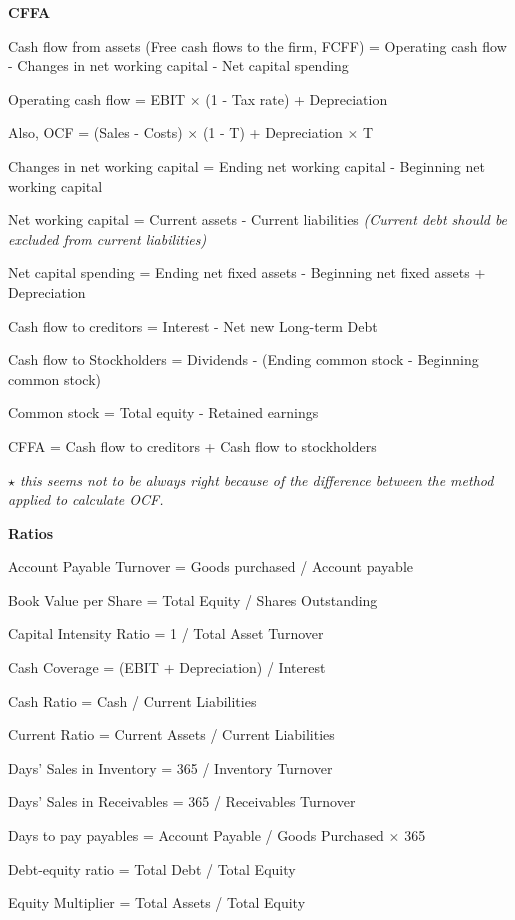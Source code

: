 \documentclass{article}
\newcommand{\properframed}[1]{
	{
		\centering
		\vspace{-2 ex}
		\begin{framed}
			\vspace{-1.5 ex}
			#1
			\vspace{-1.5 ex}
		\end{framed}
		\vspace{-2 ex}
	}
}
\newcommand{\bigtitle}[1]{
	\noindent
	\textbf{#1}
}
\begin{document}
\twocolumn


\bigtitle{CFFA}

Cash flow from assets (Free cash flows to the firm, FCFF)
= Operating cash flow - Changes in net working capital - Net capital spending

Operating cash flow = EBIT $\times$ (1 - Tax rate) + Depreciation

\properframed{
Also, OCF = (Sales - Costs) $\times$ (1 - T) + Depreciation $\times$ T
}

Changes in net working capital = Ending net working capital - Beginning net working capital

Net working capital = Current assets - Current liabilities
\textit{(Current debt should be excluded from current liabilities)}

Net capital spending = Ending net fixed assets - Beginning net fixed assets + Depreciation


Cash flow to creditors = Interest - Net new Long-term Debt

Cash flow to Stockholders = Dividends - (Ending common stock - Beginning common stock)

Common stock = Total equity - Retained earnings

CFFA = Cash flow to creditors + Cash flow to stockholders 

\textit{
$\star$ this seems not to be always right because of the difference between the method applied to calculate OCF.
}




\bigtitle{Ratios}

Account Payable Turnover = Goods purchased / Account payable

Book Value per Share = Total Equity / Shares Outstanding

Capital Intensity Ratio = 1 / Total Asset Turnover

Cash Coverage = (EBIT + Depreciation) / Interest

Cash Ratio = Cash / Current Liabilities

Current Ratio = Current Assets / Current Liabilities

Days' Sales in Inventory = 365 / Inventory Turnover

Days' Sales in Receivables = 365 / Receivables Turnover

Days to pay payables = Account Payable / Goods Purchased $\times$ 365

Debt-equity ratio = Total Debt / Total Equity

Equity Multiplier = Total Assets / Total Equity
\end{document}
